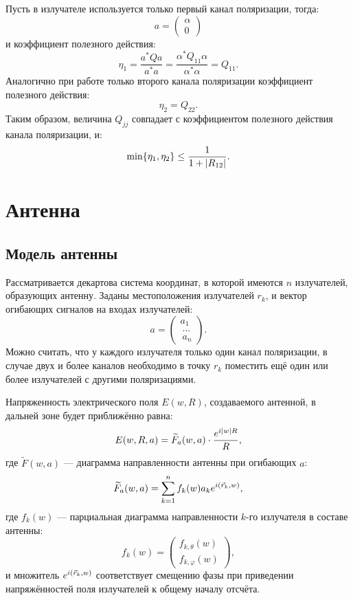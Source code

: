 Пусть в излучателе используется только первый канал поляризации, тогда:
\[
    a
    = \begin{pmatrix}
          \alpha \\
          0
    \end{pmatrix}
\]
и коэффициент полезного действия:
\[
    \eta_1
    = \frac{a^* Q a}{a^* a}
    = \frac{\alpha^* Q_{11} \alpha}{\alpha^* \alpha}
    = Q_{11}.
\]
Аналогично при работе только второго канала поляризации коэффициент полезного действия:
\[
    \eta_2 = Q_{22} .
\]
Таким образом, величина $Q_{jj}$ совпадает с коэффициентом полезного действия канала поляризации, и:
\[
    \min \{ \eta_1, \eta_2 \} \le \frac{1}{1 + \left | R_{12} \right |} .
\]

\section{Антенна}

\subsection{Модель антенны}

Рассматривается декартова система координат, в которой имеются $n$ излучателей, образующих антенну. Заданы местоположения излучателей $r_k$, и вектор огибающих
сигналов на входах излучателей:
\[
    a
    = \begin{pmatrix}
          a_1 \\\
          \dots \\\
          a_n
    \end{pmatrix} .
\]
Можно считать, что у каждого излучателя только один канал поляризации, в случае двух и более каналов необходимо в точку $r_k$ поместить ещё один или более
излучателей с другими поляризациями.

Напряженность электрического поля $E(w,R)$, создаваемого антенной, в дальней зоне будет приближённо равна:
\[
    E(w,R,a) = \widetilde{F}_a(w,a) \cdot \frac{e^{i \left | w \right | R}}{R} ,
\]
где $\widetilde{F}(w,a)$ --- диаграмма направленности антенны при огибающих $a$:
\[
    \widetilde{F}_a(w,a) = \sum_{k=1}^n f_k(w) a_k e^{i \left ( \vec{r}_k, w \right )} ,
\]
где $f_k(w)$ --- парциальная диаграмма направленности $k$-го излучателя в составе антенны:
\[
    f_k(w) =
    \begin{pmatrix}
        f_{k,\theta}(w) \\
        f_{k,\varphi}(w)
    \end{pmatrix}
    ,
\]
и множитель $e^{i \left ( \vec{r}_k, w \right )}$ соответствует смещению фазы при приведении напряжённостей поля излучателей к общему началу отсчёта.

